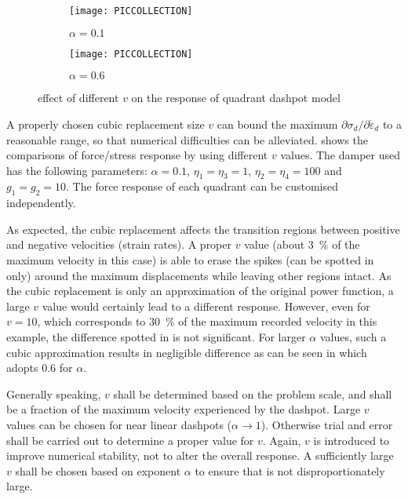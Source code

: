 \begin{figure}[htb]
\centering\scriptsize
\begin{subfigure}{.49\textwidth}\centering
\texttt{[image: PICCOLLECTION]}
\caption{$\alpha=0.1$}\label{fig:para_a}
\end{subfigure}\hfill
\begin{subfigure}{.49\textwidth}\centering
\texttt{[image: PICCOLLECTION]}
\caption{$\alpha=0.6$}\label{fig:para_b}
\end{subfigure}
\caption{effect of different $v$ on the response of quadrant dashpot model}
\end{figure}
A properly chosen cubic replacement size $v$ can bound the maximum $\partial\sigma_d/\partial\dot\varepsilon_d$ to a reasonable range, so that numerical difficulties can be alleviated.  shows the comparisons of force/stress response by using different $v$ values. The damper used has the following parameters: $\alpha=0.1$, $\eta_1=\eta_3=1$, $\eta_2=\eta_4=100$ and $g_1=g_2=10$. The force response of each quadrant can be customised independently.

As expected, the cubic replacement affects the transition regions between positive and negative velocities (strain rates). A proper $v$ value (about \SI{3}{\percent} of the maximum velocity in this case) is able to erase the spikes (can be spotted in  only) around the maximum displacements while leaving other regions intact. As the cubic replacement is only an approximation of the original power function, a large $v$ value would certainly lead to a different response. However, even for $v=10$, which corresponds to \SI{30}{\percent} of the maximum recorded velocity in this example, the difference spotted in  is not significant. For larger $\alpha$ values, such a cubic approximation results in negligible difference as can be seen in  which adopts \num{0.6} for $\alpha$.

Generally speaking, $v$ shall be determined based on the problem scale, and shall be a fraction of the maximum velocity experienced by the dashpot. Large $v$ values can be chosen for near linear dashpots ($\alpha\rightarrow1$). Otherwise trial and error shall be carried out to determine a proper value for $v$. Again, $v$ is introduced to improve numerical stability, not to alter the overall response. A sufficiently large $v$ shall be chosen based on exponent $\alpha$ to ensure that  is not disproportionately large.
